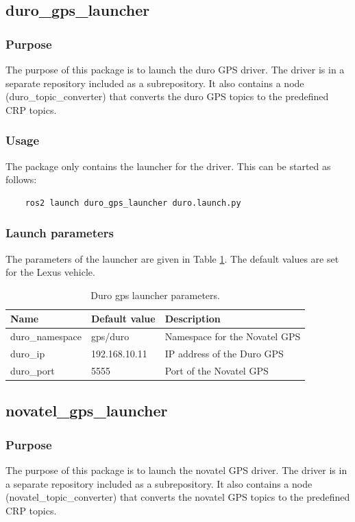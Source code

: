 \documentclass[sn-mathphys-num]{sn-jnl}%
\begin{document}
\subsection{duro\_gps\_launcher}
\subsubsection{Purpose}
The purpose of this package is to launch the duro GPS driver. The driver is in a separate repository included as a subrepository. It also contains a node (duro\_topic\_converter) that converts the duro GPS topics to the predefined CRP topics.
\subsubsection{Usage}
The package only contains the launcher for the driver. This can be started as follows:
\begin{lstlisting}
    ros2 launch duro_gps_launcher duro.launch.py
\end{lstlisting}
\subsubsection{Launch parameters}
The parameters of the launcher are given in Table \ref{tab:duro_gps_launcher}. The default values are set for the Lexus vehicle.
\begin{table}[!h]
    \captionsetup{justification=centering}
    \normalsize
    \caption{\label{tab:duro_gps_launcher} Duro gps launcher parameters.}
    \begin{tabular}{| l | l | l |}
        \hline
        \textbf{Name} & \textbf{Default value} & \textbf{Description} \\
        \hline
        duro\_namespace  & gps/duro       & Namespace for the Novatel GPS \\
        \hline
        duro\_ip         & 192.168.10.11  & IP address of the Duro GPS \\
        \hline
        duro\_port       & 5555           & Port of the Novatel GPS \\
        \hline
    \end{tabular}
\end{table}


\subsection{novatel\_gps\_launcher}
\subsubsection{Purpose}
The purpose of this package is to launch the novatel GPS driver. The driver is in a separate repository included as a subrepository. It also contains a node (novatel\_topic\_converter) that converts the novatel GPS topics to the predefined CRP topics.
\end{document}
